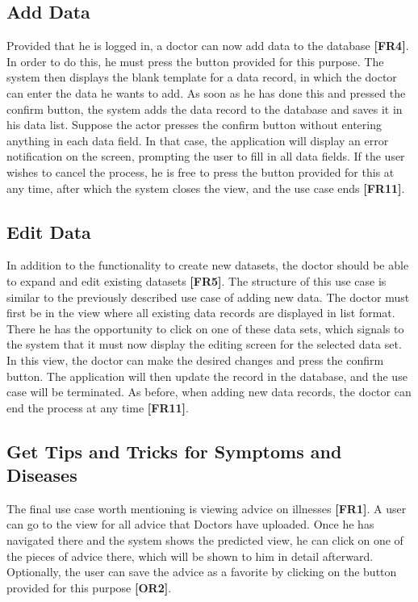 \subsection{Add Data}
Provided that he is logged in, a doctor can now add data to the database \textbf{[FR4]}. In order to do this, he must press the button provided for this purpose. The system then displays the blank template for a data record, in which the doctor can enter the data he wants to add. As soon as he has done this and pressed the confirm button, the system adds the data record to the database and saves it in his data list. Suppose the actor presses the confirm button without entering anything in each data field. In that case, the application will display an error notification on the screen, prompting the user to fill in all data fields. If the user wishes to cancel the process, he is free to press the button provided for this at any time, after which the system closes the view, and the use case ends \textbf{[FR11]}. 

\subsection{Edit Data}
In addition to the functionality to create new datasets, the doctor should be able to expand and edit existing datasets \textbf{[FR5]}. The structure of this use case is similar to the previously described use case of adding new data. The doctor must first be in the view where all existing data records are displayed in list format. There he has the opportunity to click on one of these data sets, which signals to the system that it must now display the editing screen for the selected data set. In this view, the doctor can make the desired changes and press the confirm button. The application will then update the record in the database, and the use case will be terminated. As before, when adding new data records, the doctor can end the process at any time \textbf{[FR11]}.

\subsection{Get Tips and Tricks for Symptoms and Diseases}
The final use case worth mentioning is viewing advice on illnesses \textbf{[FR1]}. A user can go to the view for all advice that Doctors have uploaded. Once he has navigated there and the system shows the predicted view, he can click on one of the pieces of advice there, which will be shown to him in detail afterward. Optionally, the user can save the advice as a favorite by clicking on the button provided for this purpose \textbf{[OR2]}. 

